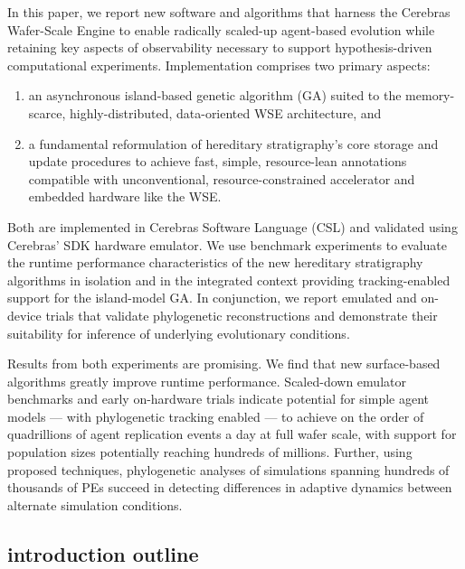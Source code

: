 In this paper, we report new software and algorithms that harness the Cerebras Wafer-Scale Engine to enable radically scaled-up agent-based evolution while retaining key aspects of observability necessary to support hypothesis-driven computational experiments.
Implementation comprises two primary aspects:
\begin{enumerate}
  \item an asynchronous island-based genetic algorithm (GA) suited to the memory-scarce, highly-distributed, data-oriented WSE architecture, and
  \item a fundamental reformulation of hereditary stratigraphy's core storage and update procedures to achieve fast, simple, resource-lean annotations compatible with unconventional, resource-constrained accelerator and embedded hardware like the WSE.
\end{enumerate}

Both are implemented in Cerebras Software Language (CSL) and validated using Cerebras' SDK hardware emulator.
We use benchmark experiments to evaluate the runtime performance characteristics of the new hereditary stratigraphy algorithms in isolation and in the integrated context providing tracking-enabled support for the island-model GA.
In conjunction, we report emulated and on-device trials that validate phylogenetic reconstructions and demonstrate their suitability for inference of underlying evolutionary conditions.

Results from both experiments are promising.
We find that new surface-based algorithms greatly improve runtime performance.
Scaled-down emulator benchmarks and early on-hardware trials indicate potential for simple agent models --- with phylogenetic tracking enabled --- to achieve on the order of quadrillions of agent replication events a day at full wafer scale, with support for population sizes potentially reaching hundreds of millions.
Further, using proposed techniques, phylogenetic analyses of simulations spanning hundreds of thousands of PEs succeed in detecting differences in adaptive dynamics between alternate simulation conditions.

\subsection{introduction outline}

